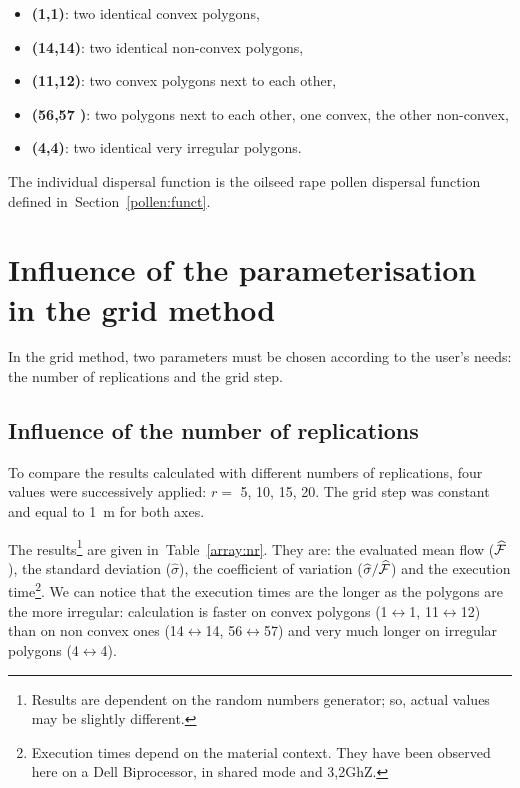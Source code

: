 \begin{itemize}
\item
\textbf{(1,1)}: two identical convex polygons,
\item
\textbf{(14,14)}: two identical non-convex polygons,
\item
\textbf{(11,12)}: two convex polygons next to each other,
\item
\textbf{(56,57 )}: two polygons next to each other, one  convex, the
other non-convex,
\item
\textbf{(4,4)}: two identical very irregular polygons.
\end{itemize}
The individual dispersal function is
the oilseed rape pollen dispersal function
defined in~Section~\ref{pollen:funct}.


\section{Influence of the parameterisation in the grid method}


In the grid method, two parameters must be chosen
according to the user's needs:
 the number of
replications and  the grid step.

\subsection{Influence of the number of replications}

To compare the results calculated with different numbers of
replications, 
four values were successively applied:
$r=$ 5, 10, 15, 20. The grid step was constant and equal to 1~m
for both axes.

The results\footnote{Results are dependent on the random numbers generator; so,
actual values may be slightly different.} 
are given in~Table~\ref{array:nr}.
They are:
the evaluated mean flow ($\widehat{{\cal F}}$),
the standard deviation ($\widehat\sigma$),
 the coefficient of variation ($\widehat\sigma/\widehat{{\cal F}}$)
and the execution time\footnote{
Execution times depend on the material context.
They have been observed here on a Dell Biprocessor, in shared mode
and 3,2GhZ.}.
We can notice that 
the execution times are the
longer as the polygons are the more irregular:
calculation is faster on convex polygons 
(1$\leftrightarrow$1, 11$\leftrightarrow$12) than on non convex ones
(14$\leftrightarrow$14, 56$\leftrightarrow$57)
and very much longer on irregular polygons (4$\leftrightarrow$4).



